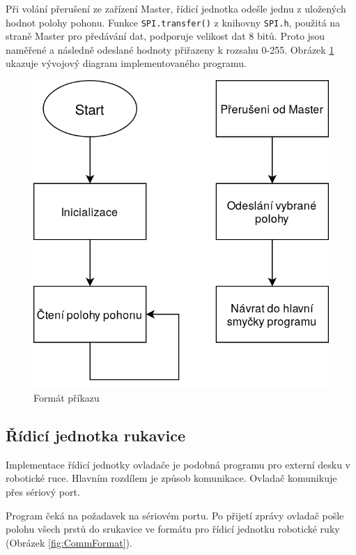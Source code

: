 \documentclass[thesis=B,czech]{FITthesis}[2012/06/26]
\begin{document}
Při volání přerušení ze zařízení Master, řídicí jednotka odešle jednu z uložených hodnot polohy pohonu. Funkce \texttt{SPI.transfer()} z knihovny \texttt{SPI.h}, použitá na straně Master pro předávání dat, podporuje velikost dat 8 bitů. Proto jsou naměřené a následně odeslané hodnoty přiřazeny k rozsahu 0-255. Obrázek \ref{fig:ExtDeskProgDiag} ukazuje vývojový diagram implementovaného programu.

\newpage

 \begin{figure}[H]
\centering
\includegraphics[scale=0.35]{./image/ExtDeskProgDiag.png}
\caption{Formát příkazu}
\label{fig:ExtDeskProgDiag}
\end{figure} 

\subsection{Řídicí jednotka rukavice}

Implementace řídicí jednotky ovladače je podobná programu pro externí desku v robotické ruce. Hlavním rozdílem je způsob komunikace. Ovladač komunikuje přes sériový port. 

Program čeká na požadavek na sériovém portu. Po přijetí zprávy ovladač pošle polohu všech prstů do srukavice ve formátu pro řídicí jednotku robotické ruky (Obrázek \ref{fig:CommFormat}). 
\end{document}
